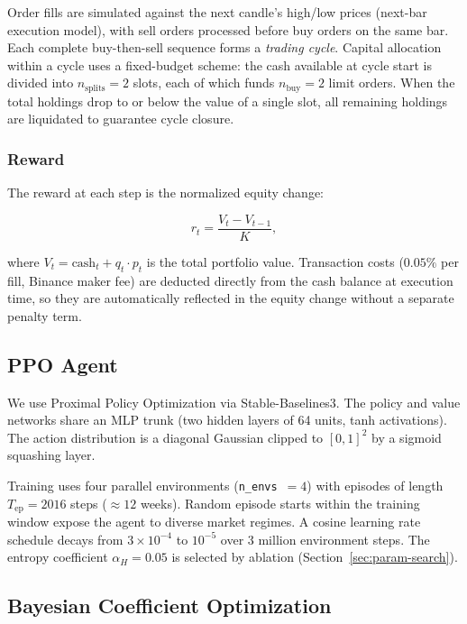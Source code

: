 \documentclass[11pt, a4paper]{article}
\begin{document}
Order fills are simulated against the next candle's high/low prices
(next-bar execution model), with sell orders processed before buy orders on the
same bar.
Each complete buy-then-sell sequence forms a \emph{trading cycle}.
Capital allocation within a cycle uses a fixed-budget scheme: the cash available
at cycle start is divided into $n_\text{splits} = 2$ slots, each of which funds
$n_\text{buy} = 2$ limit orders.
When the total holdings drop to or below the value of a single slot, all remaining
holdings are liquidated to guarantee cycle closure.

\subsubsection*{Reward}

The reward at each step is the normalized equity change:

\begin{equation}
    r_t = \frac{V_t - V_{t-1}}{K},
    \label{eq:reward}
\end{equation}

where $V_t = \text{cash}_t + q_t \cdot p_t$ is the total portfolio value.
Transaction costs ($0.05\%$ per fill, Binance maker fee) are deducted directly
from the cash balance at execution time, so they are automatically reflected in
the equity change without a separate penalty term.

\subsection{PPO Agent}

We use Proximal Policy Optimization \citep{schulman2017ppo} via Stable-Baselines3.
The policy and value networks share an MLP trunk (two hidden layers of 64 units,
tanh activations).
The action distribution is a diagonal Gaussian clipped to $[0, 1]^2$
by a sigmoid squashing layer.

Training uses four parallel environments (\texttt{n\_envs}~$= 4$) with episodes
of length $T_\text{ep} = 2016$ steps ($\approx 12$ weeks).
Random episode starts within the training window expose the agent to diverse
market regimes.
A cosine learning rate schedule decays from $3\times10^{-4}$ to $10^{-5}$
over 3 million environment steps.
The entropy coefficient $\alpha_H = 0.05$ is selected by ablation
(Section~\ref{sec:param-search}).

\subsection{Bayesian Coefficient Optimization}
\label{sec:bayesian}
\end{document}
